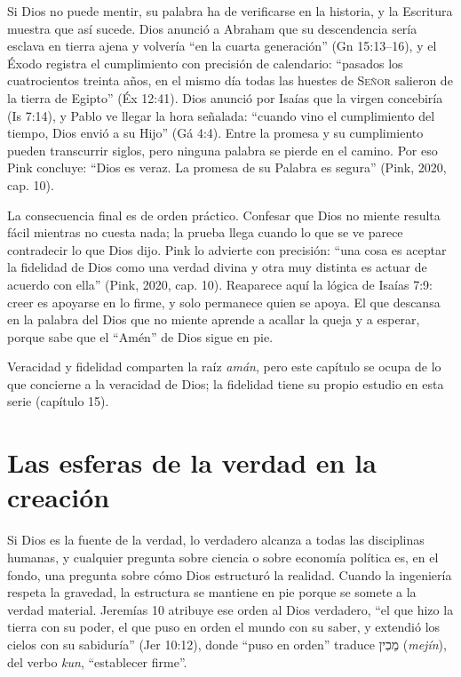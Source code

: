 \documentclass[11pt,letterpaper]{article}
\newcommand{\heb}[1]{\mbox{\foreignlanguage{hebrew}{#1}}}
\newcommand{\SENOR}{\textsc{Señor}}
\begin{document}
Si Dios no puede mentir, su palabra ha de verificarse en la historia, y la Escritura muestra que así sucede. Dios anunció a Abraham que su descendencia sería esclava en tierra ajena y volvería ``en la cuarta generación'' (Gn 15:13--16), y el Éxodo registra el cumplimiento con precisión de calendario: ``pasados los cuatrocientos treinta años, en el mismo día todas las huestes de \SENOR{} salieron de la tierra de Egipto'' (Éx 12:41). Dios anunció por Isaías que la virgen concebiría (Is 7:14), y Pablo ve llegar la hora señalada: ``cuando vino el cumplimiento del tiempo, Dios envió a su Hijo'' (Gá 4:4). Entre la promesa y su cumplimiento pueden transcurrir siglos, pero ninguna palabra se pierde en el camino. Por eso Pink concluye: ``Dios es veraz. La promesa de su Palabra es segura'' (Pink, 2020, cap. 10).

La consecuencia final es de orden práctico. Confesar que Dios no miente resulta fácil mientras no cuesta nada; la prueba llega cuando lo que se ve parece contradecir lo que Dios dijo. Pink lo advierte con precisión: ``una cosa es aceptar la fidelidad de Dios como una verdad divina y otra muy distinta es actuar de acuerdo con ella'' (Pink, 2020, cap. 10). Reaparece aquí la lógica de Isaías 7:9: creer es apoyarse en lo firme, y solo permanece quien se apoya. El que descansa en la palabra del Dios que no miente aprende a acallar la queja y a esperar, porque sabe que el ``Amén'' de Dios sigue en pie.

\begin{nota}[Precisión]
Veracidad y fidelidad comparten la raíz \emph{amán}, pero este capítulo se ocupa de lo que concierne a la veracidad de Dios; la fidelidad tiene su propio estudio en esta serie (capítulo 15).
\end{nota}

\section{Las esferas de la verdad en la creación}

Si Dios es la fuente de la verdad, lo verdadero alcanza a todas las disciplinas humanas, y cualquier pregunta sobre ciencia o sobre economía política es, en el fondo, una pregunta sobre cómo Dios estructuró la realidad. Cuando la ingeniería respeta la gravedad, la estructura se mantiene en pie porque se somete a la verdad material. Jeremías 10 atribuye ese orden al Dios verdadero, ``el que hizo la tierra con su poder, el que puso en orden el mundo con su saber, y extendió los cielos con su sabiduría'' (Jer 10:12), donde ``puso en orden'' traduce \heb{מֵכִין} (\emph{mejín}), del verbo \emph{kun}, ``establecer firme''.
\end{document}
